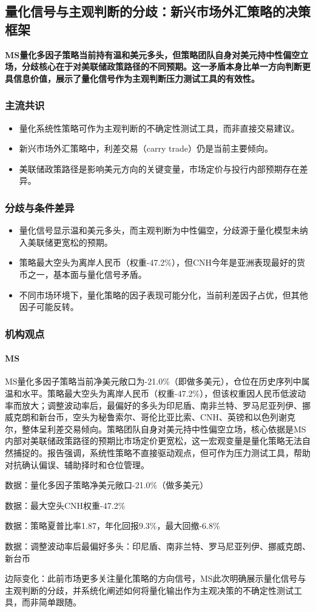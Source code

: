 \documentclass[11pt]{ctexart}
\begin{document}
\subsection{量化信号与主观判断的分歧：新兴市场外汇策略的决策框架}
\textbf{MS量化多因子策略当前持有温和美元多头，但策略团队自身对美元持中性偏空立场，分歧核心在于对美联储政策路径的不同预期。这一矛盾本身比单一方向判断更具信息价值，展示了量化信号作为主观判断压力测试工具的有效性。}
\subsubsection*{主流共识}
\begin{itemize}
  \item 量化系统性策略可作为主观判断的不确定性测试工具，而非直接交易建议。
  \item 新兴市场外汇策略中，利差交易（carry trade）仍是当前主要倾向。
  \item 美联储政策路径是影响美元方向的关键变量，市场定价与投行内部预期存在差异。
\end{itemize}
\subsubsection*{分歧与条件差异}
\begin{itemize}
  \item 量化信号显示温和美元多头，而主观判断为中性偏空，分歧源于量化模型未纳入美联储更宽松的预期。
  \item 策略最大空头为离岸人民币（权重-47.2\%），但CNH今年是亚洲表现最好的货币之一，基本面与量化信号矛盾。
  \item 不同市场环境下，量化策略的因子表现可能分化，当前利差因子占优，但其他因子可能反转。
\end{itemize}
\subsubsection*{机构观点}
\paragraph{MS} MS量化多因子策略当前净美元敞口为-21.0\%（即做多美元），仓位在历史序列中属温和水平。策略最大空头为离岸人民币（权重-47.2\%），但该权重因人民币低波动率而放大；调整波动率后，最偏好的多头为印尼盾、南非兰特、罗马尼亚列伊、挪威克朗和新台币，空头为秘鲁索尔、哥伦比亚比索、CNH、英镑和以色列谢克尔，整体呈利差交易倾向。策略团队自身对美元持中性偏空立场，核心依据是MS内部对美联储政策路径的预期比市场定价更宽松，这一宏观变量是量化策略无法自然捕捉的。报告强调，系统性策略不直接驱动观点，但可作为压力测试工具，帮助对抗确认偏误、辅助择时和仓位管理。
{\small\color{refgray}数据：量化多因子策略净美元敞口-21.0\%（做多美元）\par}
{\small\color{refgray}数据：最大空头CNH权重-47.2\%\par}
{\small\color{refgray}数据：策略夏普比率1.87，年化回报9.3\%，最大回撤-6.8\%\par}
{\small\color{refgray}数据：调整波动率后最偏好多头：印尼盾、南非兰特、罗马尼亚列伊、挪威克朗、新台币\par}
{\small\color{refgray}边际变化：此前市场更多关注量化策略的方向信号，MS此次明确展示量化信号与主观判断的分歧，并系统化阐述如何将量化输出作为主观决策的不确定性测试工具，而非简单跟随。\par}
\end{document}

